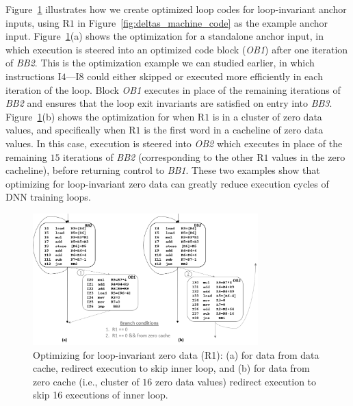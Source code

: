 Figure~\ref{fig:deltas_loop_inv_opt} illustrates how we create optimized loop codes for loop-invariant anchor inputs, using R$1$ in Figure~\ref{fig:deltas_machine_code} as the example anchor input.  Figure~\ref{fig:deltas_loop_inv_opt}(a) shows the optimization for a standalone anchor input, in which execution is steered into an optimized code block ({\it OB1}) after one iteration of {\it BB2}.  This is the optimization example we can studied earlier, in which instructions I$4$---I$8$ could either skipped or executed more efficiently in each iteration of the loop.  Block {\it OB1} executes in place of the remaining iterations of {\it BB2} and ensures that the loop exit invariants are satisfied on entry into {\it BB3}.  Figure~\ref{fig:deltas_loop_inv_opt}(b) shows the optimization for when R$1$ is in a cluster of zero data values, and specifically when R$1$ is the first word in a cacheline of zero data values.  In this case, execution is steered into {\it OB2} which executes in place of the remaining $15$ iterations of {\it BB2} (corresponding to the other R$1$ values in the zero cacheline), before returning control to {\it BB1}.  These two examples show that optimizing for loop-invariant zero data can greatly reduce execution cycles of DNN training loops. 

\begin{figure}[h]
\centering
\includegraphics[height=2in, width=.95\columnwidth]{Figures/loop-invariant-zopt.png}
\caption{Optimizing for loop-invariant zero data (R1): (a) for data from data cache, redirect execution to skip inner loop, and (b) for data from zero cache (i.e., cluster of $16$ zero data values) redirect execution to skip 16 executions of inner loop.}
\label{fig:deltas_loop_inv_opt}
\end{figure}

